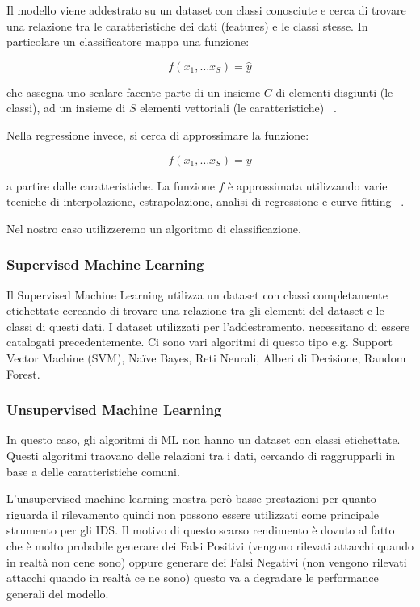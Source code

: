 Il modello viene addestrato su un dataset con classi conosciute e cerca di trovare una relazione tra le caratteristiche dei dati (features) e le classi stesse. 
In particolare un classificatore mappa una funzione: 

\[
f(x_1,\ldots x_S) = \hat y
\]

che assegna uno scalare facente parte di un insieme $C$ di elementi disgiunti (le classi), ad un insieme di $S$ elementi vettoriali (le caratteristiche) ~\cite{hoffmannBenchmarkingClassificationRegression2019}.


Nella regressione invece, si cerca di approssimare la funzione: 

\[
f(x_1,\ldots x_S) = y
\]

a partire dalle caratteristiche. La funzione $f$ è approssimata utilizzando varie tecniche di interpolazione, estrapolazione, analisi di regressione e curve fitting ~\cite{hoffmannBenchmarkingClassificationRegression2019}.


Nel nostro caso utilizzeremo un algoritmo di classificazione.




\subsubsection{Supervised Machine Learning}

Il Supervised Machine Learning utilizza un dataset con classi completamente etichettate cercando di trovare una relazione tra gli elementi del dataset e le classi di questi dati. 
I dataset utilizzati per l'addestramento, necessitano di essere catalogati precedentemente.
Ci sono vari algoritmi di questo tipo e.g. Support Vector Machine (SVM), Naïve Bayes, Reti Neurali, Alberi di Decisione, Random Forest.


\subsubsection{Unsupervised Machine Learning}

In questo caso, gli algoritmi di ML non hanno un dataset con classi etichettate. Questi algoritmi traovano delle relazioni tra i dati, cercando di raggrupparli in base a delle caratteristiche comuni.

L'unsupervised machine learning mostra però basse prestazioni per quanto riguarda il rilevamento quindi non possono essere utilizzati come principale strumento per gli IDS. Il motivo di questo scarso rendimento è dovuto al fatto che è molto probabile generare dei Falsi Positivi (vengono rilevati attacchi quando in realtà non cene sono) oppure generare dei Falsi Negativi (non vengono rilevati attacchi quando in realtà ce ne sono) questo va a degradare le performance generali del modello.

